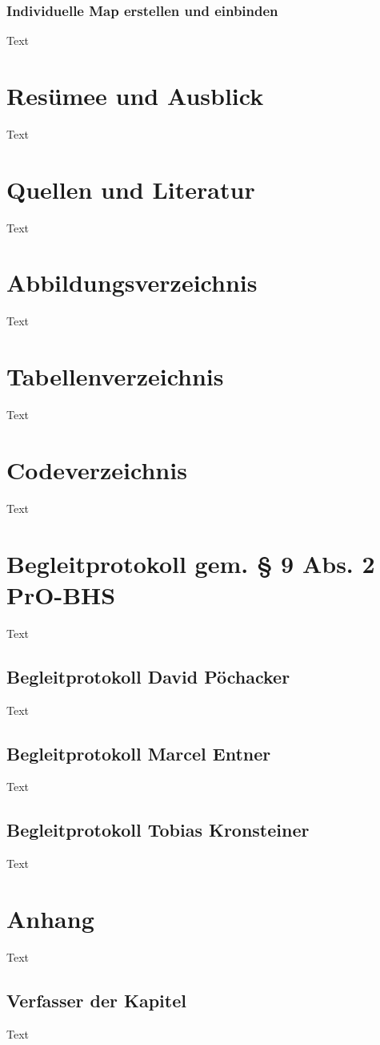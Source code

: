 \subsection{Individuelle Map erstellen und einbinden}
Text



\chapter{Resümee und Ausblick}
Text


\chapter{Quellen und Literatur}
Text

\chapter{Abbildungsverzeichnis}
Text
\chapter{Tabellenverzeichnis}
Text
\chapter{Codeverzeichnis}
Text


\chapter{Begleitprotokoll gem. § 9 Abs. 2 PrO-BHS}
Text
\section{Begleitprotokoll David Pöchacker}
Text
\section{Begleitprotokoll Marcel Entner}
Text
\section{Begleitprotokoll Tobias Kronsteiner}
Text



\chapter{Anhang}
Text

\section{Verfasser der Kapitel}
Text
